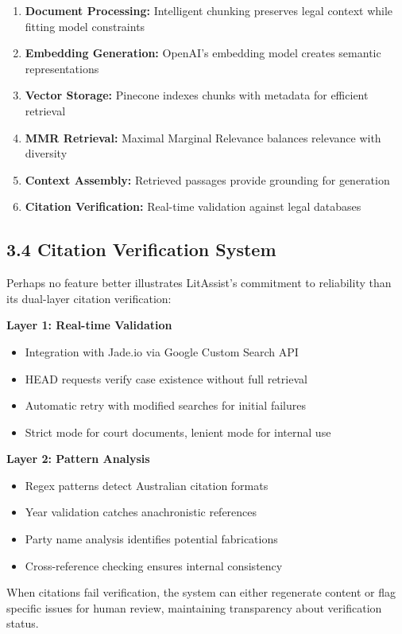 \documentclass[12pt,a4paper]{article}
\begin{document}
\begin{enumerate}
\item \textbf{Document Processing:} Intelligent chunking preserves legal context while fitting model constraints
\item \textbf{Embedding Generation:} OpenAI's embedding model creates semantic representations
\item \textbf{Vector Storage:} Pinecone indexes chunks with metadata for efficient retrieval
\item \textbf{MMR Retrieval:} Maximal Marginal Relevance balances relevance with diversity
\item \textbf{Context Assembly:} Retrieved passages provide grounding for generation
\item \textbf{Citation Verification:} Real-time validation against legal databases
\end{enumerate}

\subsection*{3.4 Citation Verification System}

Perhaps no feature better illustrates LitAssist's commitment to reliability than its dual-layer citation verification:

\textbf{Layer 1: Real-time Validation}
\begin{itemize}
\item Integration with Jade.io via Google Custom Search API
\item HEAD requests verify case existence without full retrieval
\item Automatic retry with modified searches for initial failures
\item Strict mode for court documents, lenient mode for internal use
\end{itemize}

\textbf{Layer 2: Pattern Analysis}
\begin{itemize}
\item Regex patterns detect Australian citation formats
\item Year validation catches anachronistic references  
\item Party name analysis identifies potential fabrications
\item Cross-reference checking ensures internal consistency
\end{itemize}

When citations fail verification, the system can either regenerate content or flag specific issues for human review, maintaining transparency about verification status.
\end{document}
